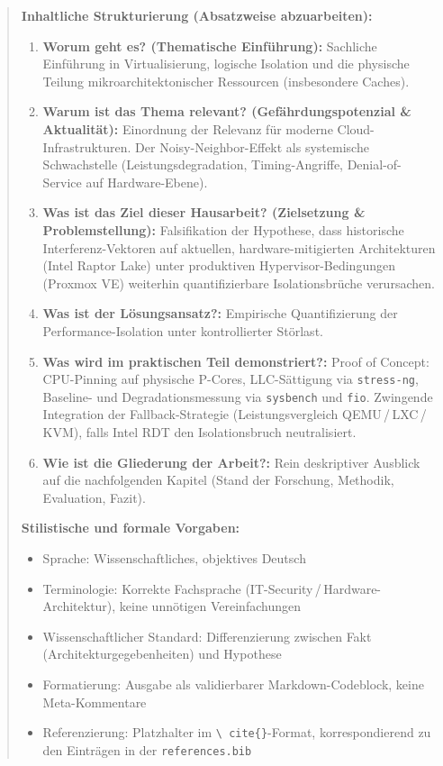 \documentclass[conference]{IEEEtran}
\begin{document}
\begin{quote}
\medskip
\noindent\textbf{Inhaltliche Strukturierung (Absatzweise abzuarbeiten):}
\begin{enumerate}
  \item \textbf{Worum geht es? (Thematische Einführung):} Sachliche
        Einführung in Virtualisierung, logische Isolation und die
        physische Teilung mikroarchitektonischer Ressourcen
        (insbesondere Caches).
  \item \textbf{Warum ist das Thema relevant? (Gefährdungspotenzial \&
        Aktualität):} Einordnung der Relevanz für moderne
        Cloud-Infrastrukturen. Der Noisy-Neighbor-Effekt als
        systemische Schwachstelle (Leistungsdegradation,
        Timing-Angriffe, Denial-of-Service auf Hardware-Ebene).
  \item \textbf{Was ist das Ziel dieser Hausarbeit? (Zielsetzung \&
        Problemstellung):} Falsifikation der Hypothese, dass
        historische Interferenz-Vektoren auf aktuellen,
        hardware-mitigierten Architekturen (Intel Raptor Lake) unter
        produktiven Hypervisor-Bedingungen (Proxmox VE) weiterhin
        quantifizierbare Isolationsbrüche verursachen.
  \item \textbf{Was ist der Lösungsansatz?:} Empirische
        Quantifizierung der Performance-Isolation unter kontrollierter
        Störlast.
  \item \textbf{Was wird im praktischen Teil demonstriert?:}
        Proof of Concept: CPU-Pinning auf physische P-Cores,
        LLC-Sättigung via \texttt{stress-ng}, Baseline- und
        Degradationsmessung via \texttt{sysbench} und \texttt{fio}.
        Zwingende Integration der Fallback-Strategie (Leistungsvergleich
        QEMU\,/\,LXC\,/\,KVM), falls Intel RDT den Isolationsbruch
        neutralisiert.
  \item \textbf{Wie ist die Gliederung der Arbeit?:} Rein deskriptiver
        Ausblick auf die nachfolgenden Kapitel (Stand der Forschung,
        Methodik, Evaluation, Fazit).
\end{enumerate}

\medskip
\noindent\textbf{Stilistische und formale Vorgaben:}
\begin{itemize}
  \item Sprache: Wissenschaftliches, objektives Deutsch
  \item Terminologie: Korrekte Fachsprache (IT-Security\,/\,Hardware-%
        Architektur), keine unnötigen Vereinfachungen
  \item Wissenschaftlicher Standard: Differenzierung zwischen Fakt
        (Architekturgegebenheiten) und Hypothese
  \item Formatierung: Ausgabe als validierbarer Markdown-Codeblock,
        keine Meta-Kommentare
  \item Referenzierung: Platzhalter im \texttt{\textbackslash
        cite\{\}}-Format, korrespondierend zu den Einträgen
        in der \texttt{references.bib}
\end{itemize}
\end{quote}
\end{document}
